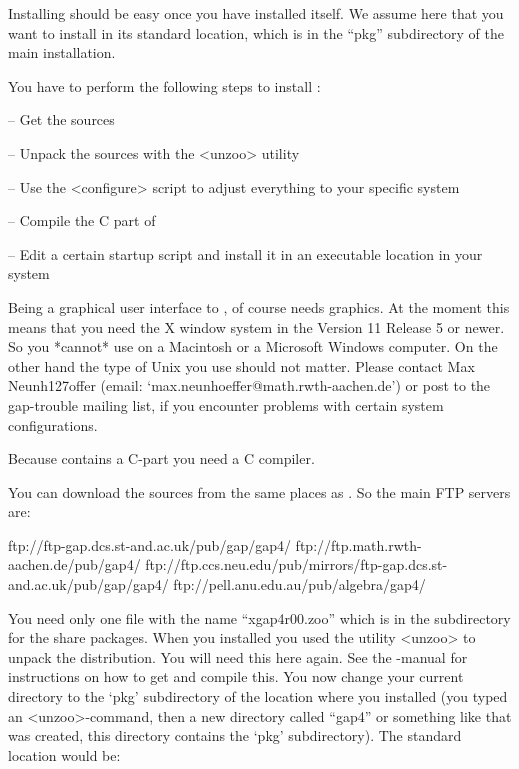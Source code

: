 
Installing {\XGAP} should be easy once you have installed {\GAP} itself. We
assume here that you want to install {\XGAP} in its standard location,
which is in the ``pkg'' subdirectory of the main {} installation.


You have to perform the following steps to install {\XGAP}:

\beginlist
\item{--} Get the sources
\item{--} Unpack the sources with the <unzoo> utility
\item{--} Use the <configure> script to adjust everything to your specific
  system
\item{--} Compile the C part of {\XGAP}
\item{--} Edit a certain startup script and install it in an executable
      location in your system
\endlist


Being a graphical user interface to {\GAP}, {\XGAP} of course needs
graphics. At the moment this means that you need the X window system in the 
Version 11 Release 5 or newer. So you *cannot* use {\XGAP} on a Macintosh
or a Microsoft Windows computer. On the other hand the type of Unix you use 
should not matter. Please contact Max Neunh\accent127offer (email:
`max.neunhoeffer@math.rwth-aachen.de') or post to the gap-trouble  
mailing list, if you encounter problems with certain system configurations.

Because {\XGAP} contains a C-part you need a C compiler.


You can download the sources from the same places as {\GAP}. So the main
FTP servers are:

\begintt
ftp://ftp-gap.dcs.st-and.ac.uk/pub/gap/gap4/
ftp://ftp.math.rwth-aachen.de/pub/gap4/
ftp://ftp.ccs.neu.edu/pub/mirrors/ftp-gap.dcs.st-and.ac.uk/pub/gap/gap4/
ftp://pell.anu.edu.au/pub/algebra/gap4/
\endtt

You need only one file with the name ``xgap4r00.zoo''
which is in the subdirectory for the share packages.
When you installed {\GAP} you used the utility <unzoo> to unpack the
distribution. You will need this here again. See the {\GAP}-manual for
instructions on how to get and compile this.
You now change your current directory to the `pkg' subdirectory of the 
location where you installed
{\GAP} (you typed an <unzoo>-command, then a new directory called
``gap4'' or something like that was created, this directory contains
the `pkg' subdirectory). The standard location would be:

